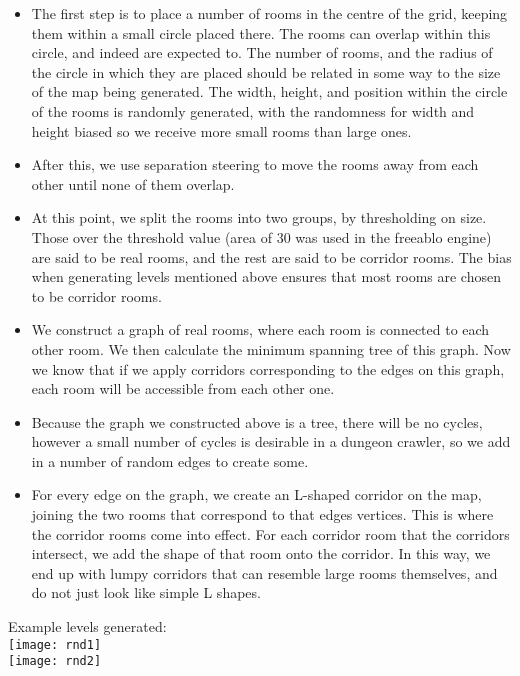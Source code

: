     \begin{itemize}
        \item
        {
            The first step is to place a number of rooms in the centre of the grid, keeping them within a small circle placed there.
            The rooms can overlap within this circle, and indeed are expected to. The number of rooms, and the radius of the circle in which they are placed
            should be related in some way to the size of the map being generated. The width, height, and position within the circle of the rooms is randomly generated, with the randomness for width and height biased so we receive more small rooms than large ones.    
        }
        \item
        {
            After this, we use separation steering to move the rooms away from each other until none of them overlap.
        }
        \item
        {
            At this point, we split the rooms into two groups, by thresholding on size. Those over the threshold value (area of 30 was used in the freeablo engine) are said to be real rooms, and the rest are said to be corridor rooms. The bias when generating levels mentioned above ensures that most rooms are chosen to be corridor rooms.
        }
        \item
        {
            We construct a graph of real rooms, where each room is connected to each other room. We then calculate the minimum spanning tree of this graph. Now we know that if we apply corridors corresponding to the edges on this graph, each room will be accessible from each other one.
        }
        \item
        {
            Because the graph we constructed above is a tree, there will be no cycles, however a small number of cycles is desirable in a dungeon crawler, so we add in a number of random edges to create some.
        }
        \item
        {
            For every edge on the graph, we create an L-shaped corridor on the map, joining the two rooms that correspond to that edges vertices.
            This is where the corridor rooms come into effect. For each corridor room that the corridors intersect, we add the shape of that room onto the corridor. In this way, we end up with lumpy corridors that can resemble large rooms themselves, and do not just look like simple L shapes.
        }
    \end{itemize}
    
    Example levels generated:\\ 
    \texttt{[image: rnd1]}\\   
    \texttt{[image: rnd2]}\\
    
